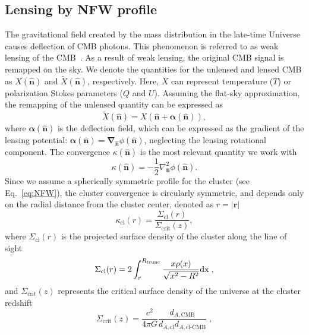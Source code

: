 \documentclass[prd, superscriptaddress, tightenlines, longbibliography, nofootinbib, eqsecnum, amsfonts, amsmath, floatfix, twocolumn, notitlepage]{revtex4-2}
\begin{document}
\subsection{Lensing by NFW profile}

The gravitational field created by the mass distribution in the late-time Universe causes deflection of CMB photons. This phenomenon is referred to as weak lensing of the CMB~\cite{Lewis:2006fu}. As a result of weak lensing, the original CMB signal is remapped on the sky. We denote the quantities for the unlensed and lensed CMB as $X (\hat{\mathbf{n}})$ and $\widetilde{X} (\hat{\mathbf{n}})$, respectively. Here, $X$ can represent temperature ($T$) or polarization Stokes parameters ($Q$ and $U$). Assuming the flat-sky approximation, the remapping of the unlensed quantity can be expressed as
\begin{equation}
\widetilde{X} (\hat{\mathbf{n}}) = X (\hat{\mathbf{n}} + \boldsymbol{\alpha}(\hat{\mathbf{n}})),
\end{equation}
where $\boldsymbol{\alpha} (\hat{\mathbf{n}})$ is the deflection field, which can be expressed as the gradient of the lensing potential: $\boldsymbol{\alpha} (\hat{\mathbf{n}}) = \boldsymbol{\nabla}_{\hat{\mathbf{n}}}\phi(\hat{\mathbf{n}})$, neglecting the lensing rotational component. The convergence $\kappa (\hat{\mathbf{n}})$ is the most relevant quantity we work with
\begin{equation}
\kappa(\hat{\mathbf{n}}) = -\frac{1}{2}\nabla^2_{\hat{\mathbf{n}}}\phi(\hat{\mathbf{n}}).
\end{equation}
Since we assume a spherically symmetric profile for the cluster (see Eq.~\ref{eq:NFW}), the cluster convergence is circularly symmetric, and depends only on the radial distance from the cluster center, denoted as $r = |\mathbf{r}|$
\begin{equation}
\kappa_{\text{cl}}(r) = \frac{\Sigma_{\text{cl}}(r)}{\Sigma_{\text{crit}}(z)},
\end{equation}
where $\Sigma_{\text{cl}}(r)$ is the projected surface density of the cluster along the line of sight
\begin{equation}
\Sigma_{\rm{cl}}(r) = 2 \int_{r}^{R_{\rm{trunc}}}\frac{x\rho(x)}{\sqrt{x^2-R^2}} \rm{d} x \; ,
\end{equation}
and $\Sigma_{\text{crit}}(z)$ represents the critical surface density of the universe at the cluster redshift
\begin{equation}
\Sigma_{\text{crit}}(z) = \frac{c^2}{4\pi G}\frac{d_{A,\text{CMB}}}{d_{A,\text{cl}}d_{A,\text{cl-CMB}}} \; ,
\end{equation}
\end{document}
